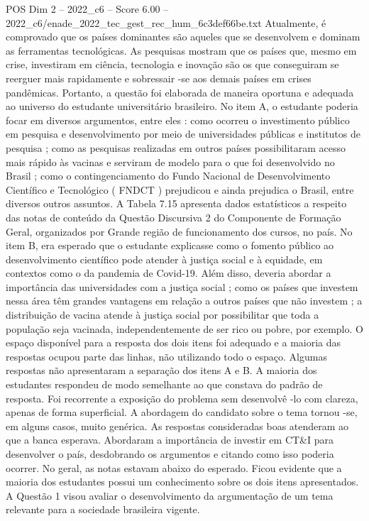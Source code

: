 \begin{textsample}{POS Dim 2 – 2022\_c6 – Score 6.00 – 2022\_c6/enade\_2022\_tec\_gest\_rec\_hum\_6c3def66be.txt}
Atualmente, é comprovado que os países dominantes são aqueles que se desenvolvem e dominam as ferramentas tecnológicas.
As pesquisas mostram que os países que, mesmo em crise, investiram em ciência, tecnologia e inovação são os que conseguiram se reerguer mais rapidamente e sobressair -se aos demais países em crises pandêmicas.
Portanto, a questão foi elaborada de maneira oportuna e adequada ao universo do estudante universitário brasileiro.
No item A, o estudante poderia focar em diversos argumentos, entre eles : como ocorreu o investimento público em pesquisa e desenvolvimento por meio de universidades públicas e institutos de pesquisa ; como as pesquisas realizadas em outros países possibilitaram acesso mais rápido às vacinas e serviram de modelo para o que foi desenvolvido no Brasil ; como o contingenciamento do Fundo Nacional de Desenvolvimento Científico e Tecnológico ( FNDCT ) prejudicou e ainda prejudica o Brasil, entre diversos outros assuntos.
A Tabela 7.15 apresenta dados estatísticos a respeito das notas de conteúdo da Questão Discursiva 2 do Componente de Formação Geral, organizados por Grande região de funcionamento dos cursos, no país.
No item B, era esperado que o estudante explicasse como o fomento público ao desenvolvimento científico pode atender à justiça social e à equidade, em contextos como o da pandemia de Covid-19.
Além disso, deveria abordar a importância das universidades com a justiça social ; como os países que investem nessa área têm grandes vantagens em relação a outros países que não investem ; a distribuição de vacina atende à justiça social por possibilitar que toda a população seja vacinada, independentemente de ser rico ou pobre, por exemplo.
O espaço disponível para a resposta dos dois itens foi adequado e a maioria das respostas ocupou parte das linhas, não utilizando todo o espaço.
Algumas respostas não apresentaram a separação dos itens A e B.
A maioria dos estudantes respondeu de modo semelhante ao que constava do padrão de resposta.
Foi recorrente a exposição do problema sem desenvolvê -lo com clareza, apenas de forma superficial.
A abordagem do candidato sobre o tema tornou -se, em alguns casos, muito genérica.
As respostas consideradas boas atenderam ao que a banca esperava.
Abordaram a importância de investir em CT\&I para desenvolver o país, desdobrando os argumentos e citando como isso poderia ocorrer.
No geral, as notas estavam abaixo do esperado.
Ficou evidente que a maioria dos estudantes possui um conhecimento sobre os dois itens apresentados.
A Questão 1 visou avaliar o desenvolvimento da argumentação de um tema relevante para a sociedade brasileira vigente.

\end{textsample}
